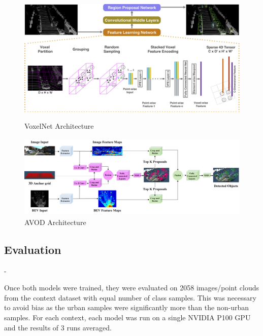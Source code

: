 \begin{figure}[H]
	\centering
	\begin{minipage}[b]{0.45\textwidth}
		\includegraphics[width=\textwidth]{images/vox_arch.png}
		\caption{VoxelNet Architecture}
		\label{fig:voxarch}
	\end{minipage}
	\hfill
	\begin{minipage}[b]{0.45\textwidth}
		\includegraphics[width=\textwidth,height=4cm]{images/avodarch.png}
		\caption{AVOD Architecture}
		\label{fig:avodarch}
	\end{minipage}
\end{figure}


\subsection{Evaluation} - 

Once both models were trained, they were evaluated on 2058 images/point clouds from the context dataset with equal number of class samples. This was necessary to avoid bias as the urban samples were significantly more than the non-urban samples. For each context, each model was run on a single NVIDIA P100 GPU and the results of 3 runs  averaged. 

